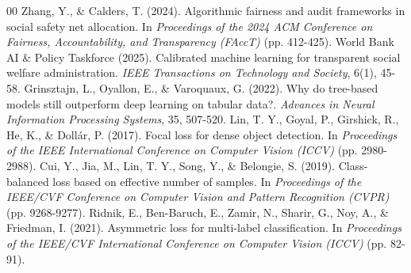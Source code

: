 \documentclass[conference]{IEEEtran}
\begin{document}
\begin{thebibliography}{00}
 Zhang, Y., \& Calders, T. (2024). Algorithmic fairness and audit frameworks in social safety net allocation. In \textit{Proceedings of the 2024 ACM Conference on Fairness, Accountability, and Transparency (FAccT)} (pp. 412-425).
 World Bank AI \& Policy Taskforce (2025). Calibrated machine learning for transparent social welfare administration. \textit{IEEE Transactions on Technology and Society}, 6(1), 45-58.
 Grinsztajn, L., Oyallon, E., \& Varoquaux, G. (2022). Why do tree-based models still outperform deep learning on tabular data?. \textit{Advances in Neural Information Processing Systems}, 35, 507-520.
 Lin, T. Y., Goyal, P., Girshick, R., He, K., \& Dollár, P. (2017). Focal loss for dense object detection. In \textit{Proceedings of the IEEE International Conference on Computer Vision (ICCV)} (pp. 2980-2988).
 Cui, Y., Jia, M., Lin, T. Y., Song, Y., \& Belongie, S. (2019). Class-balanced loss based on effective number of samples. In \textit{Proceedings of the IEEE/CVF Conference on Computer Vision and Pattern Recognition (CVPR)} (pp. 9268-9277).
 Ridnik, E., Ben-Baruch, E., Zamir, N., Sharir, G., Noy, A., \& Friedman, I. (2021). Asymmetric loss for multi-label classification. In \textit{Proceedings of the IEEE/CVF International Conference on Computer Vision (ICCV)} (pp. 82-91).
\end{thebibliography}
\end{document}
